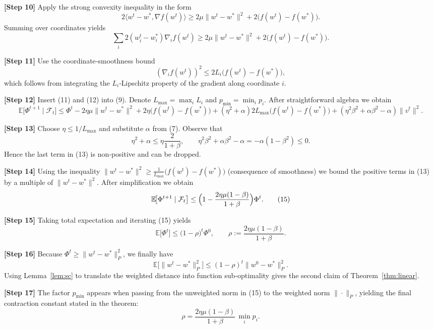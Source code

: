 \documentclass{article}
\newcommand{\E}{\mathbb{E}}
\begin{document}
\noindent\textbf{[Step 10]} Apply the strong convexity inequality in the form
\[
2\langle w^{t}-w^{*},\nabla f(w^{t})\rangle
\ge 2\mu\|w^{t}-w^{*}\|^{2}+2\bigl(f(w^{t})-f(w^{*})\bigr).
\tag{10}
\]
Summing over coordinates yields
\[
\sum_{i}2 (w^{t}_{i}-w^{*}_{i})\nabla_{i}f(w^{t})
\ge 2\mu\|w^{t}-w^{*}\|^{2}+2\bigl(f(w^{t})-f(w^{*})\bigr).
\tag{11}
\]

\noindent\textbf{[Step 11]} Use the coordinate‑smoothness bound
\[
(\nabla_{i}f(w^{t}))^{2}\le 2L_i\bigl(f(w^{t})-f(w^{*})\bigr),
\tag{12}
\]
which follows from integrating the $L_i$‑Lipschitz property of the gradient along coordinate $i$.

\noindent\textbf{[Step 12]} Insert (11) and (12) into (9). Denote $L_{\max}=\max_i L_i$ and $p_{\min}=\min_i p_i$. After straightforward algebra we obtain
\[
\E\!\bigl[\Phi^{t+1}\mid \mathcal{F}_t\bigr]
\le \Phi^{t}
 - 2\eta\mu\|w^{t}-w^{*}\|^{2}
 + 2\eta\bigl(f(w^{t})-f(w^{*})\bigr)
 + (\eta^{2}+\alpha)2L_{\max}\bigl(f(w^{t})-f(w^{*})\bigr)
 + (\eta^{2}\beta^{2}+\alpha\beta^{2}-\alpha)\|v^{t}\|^{2}.
\tag{13}
\]

\noindent\textbf{[Step 13]} Choose $\eta\le 1/L_{\max}$ and substitute $\alpha$ from (7). Observe that
\[
\eta^{2}+\alpha\le \eta\frac{2}{1+\beta},\qquad
\eta^{2}\beta^{2}+\alpha\beta^{2}-\alpha = -\alpha(1-\beta^{2})\le 0 .
\tag{14}
\]
Hence the last term in (13) is non‑positive and can be dropped.

\noindent\textbf{[Step 14]} Using the inequality $\|w^{t}-w^{*}\|^{2}\ge \frac{1}{L_{\max}}\bigl(f(w^{t})-f(w^{*})\bigr)$ (consequence of smoothness) we bound the positive terms in (13) by a multiple of $\|w^{t}-w^{*}\|^{2}$. After simplification we obtain
\[
\E\!\bigl[\Phi^{t+1}\mid \mathcal{F}_t\bigr]
\le \Bigl(1-\frac{2\eta\mu(1-\beta)}{1+\beta}\Bigr)\Phi^{t}.
\tag{15}
\]

\noindent\textbf{[Step 15]} Taking total expectation and iterating (15) yields
\[
\E\!\bigl[\Phi^{t}\bigr]\le \bigl(1-\rho\bigr)^{t}\Phi^{0},
\qquad \rho:=\frac{2\eta\mu(1-\beta)}{1+\beta}.
\tag{16}
\]

\noindent\textbf{[Step 16]} Because $\Phi^{t}\ge \|w^{t}-w^{*}\|_{P}^{2}$, we finally have
\[
\E\!\bigl[\|w^{t}-w^{*}\|_{P}^{2}\bigr]\le (1-\rho)^{t}\|w^{0}-w^{*}\|_{P}^{2}.
\tag{17}
\]
Using Lemma~\ref{lem:sc} to translate the weighted distance into function sub‑optimality gives the second claim of Theorem~\ref{thm:linear}.

\noindent\textbf{[Step 17]} The factor $p_{\min}$ appears when passing from the unweighted norm in (15) to the weighted norm $\|\cdot\|_{P}$, yielding the final contraction constant stated in the theorem:
\[
\rho = \frac{2\eta\mu(1-\beta)}{1+\beta}\,\min_i p_i .
\]
\end{document}
